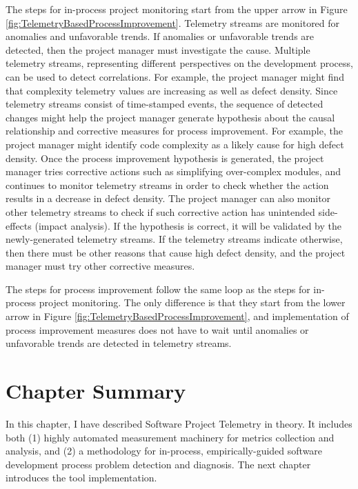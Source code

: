 The steps for in-process project monitoring start from the upper arrow in Figure \ref{fig:TelemetryBasedProcessImprovement}. Telemetry streams are monitored for anomalies and unfavorable trends. If anomalies or unfavorable trends are detected, then the project manager must investigate the cause. Multiple telemetry streams, representing different perspectives on the development process, can be used to detect correlations. For example, the project manager might find that complexity telemetry values are increasing as well as defect density. Since telemetry streams consist of time-stamped events, the sequence of detected changes might help the project manager generate hypothesis about the causal relationship and corrective measures for process improvement. For example, the project manager might identify code complexity as a likely cause for high defect density. Once the process improvement hypothesis is generated, the project manager tries corrective actions such as simplifying over-complex modules, and continues to monitor telemetry streams in order to check whether the action results in a decrease in defect density. The project manager can also monitor other telemetry streams to check if such corrective action has unintended side-effects (impact analysis). If the hypothesis is correct, it will be validated by the newly-generated telemetry streams. If the telemetry streams indicate otherwise, then there must be other reasons that cause high defect density, and the project manager must try other corrective measures.

The steps for process improvement follow the same loop as the steps for in-process project monitoring. The only difference is that they start from the lower arrow in Figure \ref{fig:TelemetryBasedProcessImprovement}, and implementation of process improvement measures does  not have to wait until anomalies or unfavorable trends are detected in telemetry streams. 









\section{Chapter Summary}
\label{Telemetry:Conclusion}

In this chapter, I have described Software Project Telemetry in theory. It includes both (1) highly automated measurement machinery for metrics collection and analysis, and (2) a methodology for in-process, empirically-guided software development process problem detection and diagnosis. The next chapter introduces the tool implementation.

